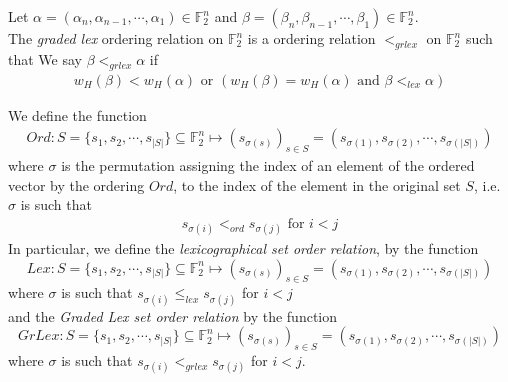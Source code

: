 \documentclass[11pt]{llncs}
\begin{document}
\begin{definition}
	Let $\alpha = (\alpha_n, \alpha_{n-1}, \cdots, \alpha_1) \in \mathbb{F}_2^n$ and $\beta = (\beta_n, \beta_{n-1}, \cdots, \beta_1) \in \mathbb{F}_2^n$.\\
	The \textit{graded lex} ordering relation on $\mathbb{F}_2^n$ is a ordering relation $<_{grlex}$ on $\mathbb{F}_2^n$ such that
	We say $\beta <_{grlex} \alpha$ if
	\begin{align*}
	w_H(\beta) < w_H(\alpha) \mbox{ or }  \left(w_H(\beta) = w_H(\alpha) \mbox{ and } \beta <_{lex} \alpha\right)
	\end{align*}
\end{definition}

\begin{definition}
	We define the function 
	\begin{align*}
	Ord: S = \{s_1, s_2, \cdots, s_{|S|}\} \subseteq \mathbb{F}_2^n \mapsto \left(s_{\sigma(s)}\right)_{s\in S} = \left(s_{\sigma(1)}, s_{\sigma(2)}, \cdots, s_{\sigma(|S|)}\right)
	\end{align*}
	where $\sigma$ is the permutation assigning the index of an element of the ordered vector by the ordering $Ord$, to the index of the element in the original set $S$, i.e. $\sigma$ is such that 
	\begin{align*}
	s_{\sigma(i)} <_{ord} s_{\sigma(j)} \mbox{ for } i<j
	\end{align*}
    In particular, we define the \textit{lexicographical set order relation}, by the function 
    $$Lex: S = \{s_1, s_2, \cdots, s_{|S|}\} \subseteq \mathbb{F}_2^n \mapsto \left(s_{\sigma(s)}\right)_{s\in S} = \left(s_{\sigma(1)}, s_{\sigma(2)}, \cdots, s_{\sigma(|S|)}\right)$$
    where $\sigma$ is such that $s_{\sigma(i)} \leq_{lex} s_{\sigma(j)}$ for $i<j$\\
    and the \textit{Graded Lex set order relation} by the function 
    $$GrLex: S = \{s_1, s_2, \cdots, s_{|S|}\} \subseteq \mathbb{F}_2^n \mapsto \left(s_{\sigma(s)}\right)_{s\in S} = \left(s_{\sigma(1)}, s_{\sigma(2)}, \cdots, s_{\sigma(|S|)}\right)$$
    where $\sigma$ is such that $s_{\sigma(i)} <_{grlex} s_{\sigma(j)}$ for $i<j$.
\end{definition}
\end{document}
